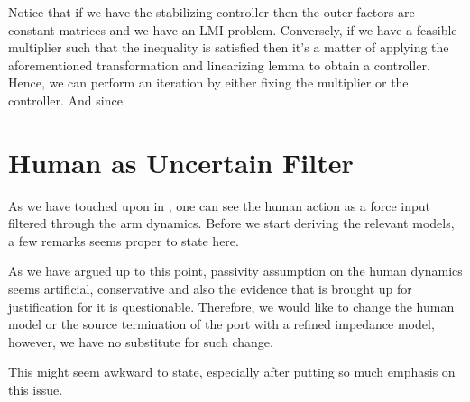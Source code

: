 Notice that if we have the stabilizing controller then the outer factors are constant matrices and we have an LMI problem. Conversely, if we have a 
feasible multiplier such that the inequality is satisfied then it's a matter of applying the aforementioned transformation and linearizing lemma to obtain
a controller. Hence, we can perform an iteration by either fixing the multiplier or the controller. And since 






\section{Human as Uncertain Filter}

As we have touched upon in , one can see the human action as a force input filtered through the
arm dynamics. Before we start deriving the relevant models, a few remarks seems proper to state here. 

As we have argued up to this point, passivity assumption on the human dynamics seems artificial, conservative and also
the evidence that is brought up for justification for it is questionable. Therefore, we would like to change the human
model or the source termination of the port with a refined impedance model, however, we have no substitute for such change. 

This might seem awkward to state, especially after putting so much emphasis on this issue. 










%







